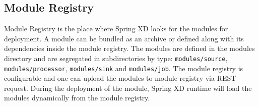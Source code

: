 \par

\subsection{Module Registry}
Module Registry is the place where Spring XD looks for the modules for
deployment. A module can be bundled as an archive or defined along with its
dependencies inside the module registry. The modules are defined in
the modules directory and are segregated in subdirectories by
type: \texttt{modules/source}, \texttt{modules/processor},
\texttt{modules/sink} and \texttt{modules/job}. The module registry is
configurable and one can upload the modules to module registry via REST request.
During the deployment of the module, Spring XD runtime will load the modules
dynamically from the module registry.
